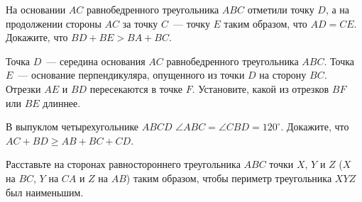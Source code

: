 \begin{problems}
\item На основании $AC$ равнобедренного треугольника $ABC$ отметили точку $D$, а на продолжении стороны $AC$ за точку $C$~--- точку $E$ таким образом, что $AD=CE$. Докажите, что $BD+BE>BA+BC$.

\item Точка $D$~--- середина основания $AC$ равнобедренного треугольника
$ABC$. Точка $E$~--- основание перпендикуляра, опущенного из точки $D$ на
сторону $BC$. Отрезки $AE$ и $BD$ пересекаются в точке $F$. Установите,
какой из отрезков $BF$ или $BE$ длиннее.

\item В выпуклом четырехугольнике $ABCD$ $\angle ABC= \angle CBD=120^{\circ}$. Докажите, что $AC+BD \geq AB+BC+CD $.

\item Расставьте на сторонах равностороннего треугольника $ABC$ точки $X$, $Y$ и $Z$ ($X$ на $BC$, $Y$ на $CA$ и $Z$ на $AB$) таким образом, чтобы периметр треугольника $XYZ$ был наименьшим.

\end{problems}